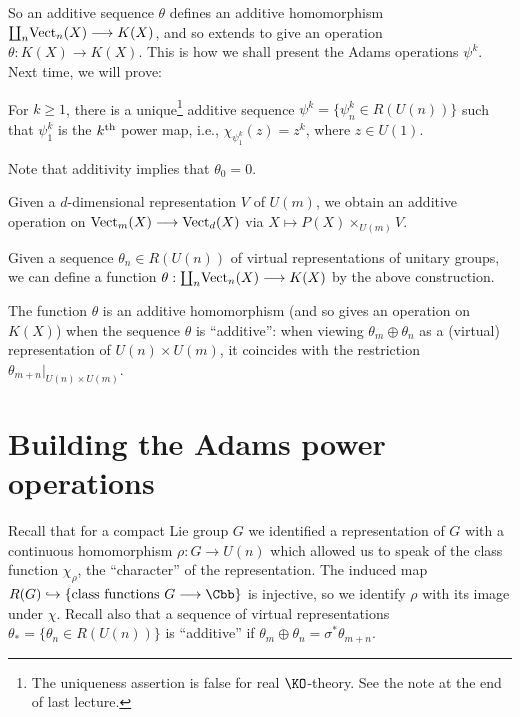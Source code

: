 So an additive sequence $\theta$ defines an additive homomorphism $\coprod_n\! \operatorname{Vect}_n(X) \longrightarrow K(X)$, and so extends to give an operation $\theta:K(X)\to K(X)$.
This is how we shall present the Adams operations $\psi^k$. Next time, we will prove:
\begin{thm}
For $k \ge 1$, there is a unique\footnote{The uniqueness assertion is false for real $\KO$-theory.  See the note at the end of last lecture.} additive sequence $\psi^k = \{\psi^k_n \in R(U(n))\}$ such that $\psi_1^k$ is the $k^\textup{th}$ power map, i.e., $\chi_{\psi^k_1}(z) = z^k$, where $z \in U(1)$.
\end{thm}
\begin{rem}
Note that additivity implies that $\theta_0 = 0$.
\end{rem}

\fi
\begin{SummaryNote}
\Bullet Given a $d$-dimensional representation $V$ of $U(m)$, we obtain an additive operation on $\operatorname{Vect}_m(X)\longrightarrow\operatorname{Vect}_d(X)$ via $X\mapsto P(X)\times_{U(m)}V$.

\Bullet Given a sequence $\theta_n\in R(U(n))$ of virtual representations of unitary groups, we can define a function $\theta:\coprod_n\!\operatorname{Vect}_n(X)\longrightarrow K(X)$ by the above construction.

\Bullet The function $\theta$ is an additive homomorphism (and so gives an operation on $K(X)$) when the sequence $\theta$ is ``additive'': when viewing $\theta_m\oplus\theta_n$ as a (virtual) representation of $U(n)\times U(m)$, it coincides with the restriction $\theta_{m+n}|_{U(n)\times U(m)}$.
\end{SummaryNote}

\section{Building the Adams power operations} %
\label{BuildingTheAdamsPowerOperations}
\ifx\OutputBuildingTheAdamsPowerOperations\undefined\else
Recall that for a compact Lie group $G$ we identified a representation of $G$ with a continuous homomorphism $\rho: G \to U(n)$ which allowed us to speak of the class function $\chi_\rho$, the ``character'' of the representation.  The induced map $R(G) \into \{\hbox{class functions $G \to \Cbb$}\}$ is injective, so we identify $\rho$ with its image under $\chi$.  Recall also that a sequence of virtual representations $\theta_* = \{\theta_n \in R(U(n))\}$ is ``additive'' if $\theta_m \oplus \theta_n = \sigma^* \theta_{m+n}$.

